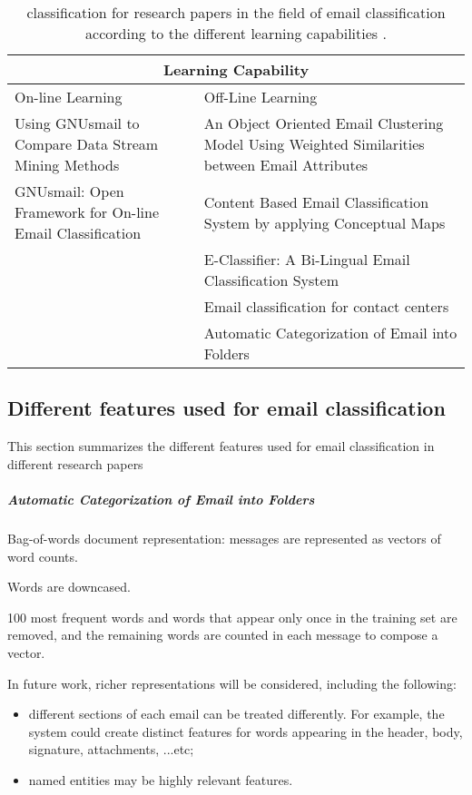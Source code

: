 \begin{center}
  \begin{table}[H]
    \begin{tabular}{|p{6cm}|p{6cm}|}
      \hline
      \multicolumn{2}{|c|}{Learning Capability} \\
      \hline
      On-line Learning & Off-Line Learning 
      \\ \hline
      Using GNUsmail to Compare Data Stream Mining Methods \cite{JOSE11} &
      An Object Oriented Email Clustering Model Using  Weighted Similarities 
      between Email Attributes \cite{NARESH10}
      \\ \hline
      GNUsmail: Open Framework for On-line Email Classification \cite{MANUEL11}
      & Content Based Email Classification System by applying Conceptual Maps \cite{BASKARAN09}
      \\ \hline
      & E-Classifier: A Bi-Lingual Email Classification System \cite{NOUF08}
      \\ \hline
      & Email classification for contact centers \cite{ANI03}
      \\ \hline
      & 
      Automatic Categorization of Email into Folders \cite{RON04}
      \\ \hline
    \end{tabular}
    \caption{classification for research papers in the field of email classification 
    according to the different learning capabilities .}
  \end{table}
\end{center}



\subsection{Different features used for email classification}
This section summarizes the different features used for email classification 
in different research papers
\subparagraph{Automatic Categorization of Email into Folders \cite{RON04}}
\begin{my_itemize}
  \item Bag-of-words document representation: messages are represented as 
  vectors of word counts.
  \item Words are downcased.
  \item 100 most frequent words and words that appear only once in the training 
  set are removed, and the remaining words are counted in each message to compose a vector.
  \item In future work, richer representations will be considered, including the following:
    \begin{itemize}
      \item different sections of each email can be treated differently. For example, 
      the system could create distinct features for words appearing in the header, 
      body, signature, attachments, ...etc;
      \item named entities may be highly relevant features.
    \end{itemize}
\end{my_itemize}

